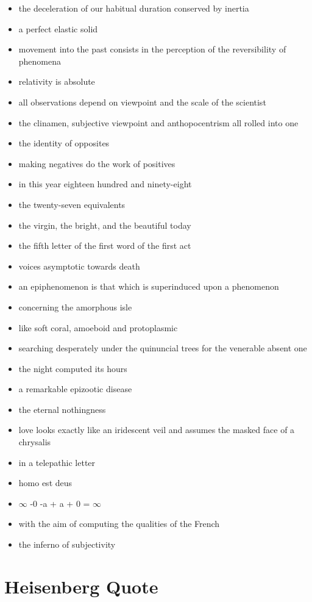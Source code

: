\begin{itemize}
  \item the deceleration of our habitual duration conserved by inertia
  \item a perfect elastic solid
  \item movement into the past consists in the perception of the reversibility of phenomena
  \item relativity is absolute
  \item all observations depend on viewpoint and the scale of the scientist
  \item the clinamen, subjective viewpoint and anthopocentrism all rolled into one
  \item the identity of opposites
  \item making negatives do the work of positives
  \item in this year eighteen hundred and ninety-eight
  \item the twenty-seven equivalents
  \item the virgin, the bright, and the beautiful today
  \item the fifth letter of the first word of the first act
  \item voices asymptotic towards death
  \item an epiphenomenon is that which is superinduced upon a phenomenon
  \item concerning the amorphous isle
  \item like soft coral, amoeboid and protoplasmic
  \item searching desperately under the quinuncial trees for the venerable absent one
  \item the night computed its hours
  \item a remarkable epizootic disease
  \item the eternal nothingness
  \item love looks exactly like an iridescent veil and assumes the masked face of a chrysalis
  \item in a telepathic letter
  \item homo est deus
  \item $\infty$ -0 -a + a + 0 = $\infty$
  \item with the aim of computing the qualities of the French
  \item the inferno of subjectivity
\end{itemize}


\section{Heisenberg Quote}
\label{s:heisenberg}

